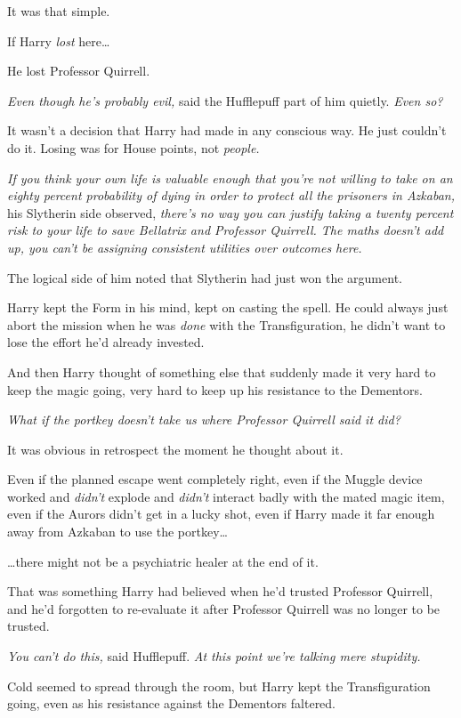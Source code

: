 It was that simple.

If Harry \emph{lost} here…

He lost Professor Quirrell.

\emph{Even though he’s probably evil,} said the Hufflepuff part of him quietly. \emph{Even so?}

It wasn’t a decision that Harry had made in any conscious way. He just couldn’t do it. Losing was for House points, not \emph{people.}

\emph{If you think your own life is valuable enough that you’re not willing to take on an eighty percent probability of dying in order to protect all the prisoners in Azkaban,} his Slytherin side observed, \emph{there’s no way you can justify taking a twenty percent risk to your life to save Bellatrix and Professor Quirrell. The maths doesn’t add up, you can’t be assigning consistent utilities over outcomes here.}

The logical side of him noted that Slytherin had just won the argument.

Harry kept the Form in his mind, kept on casting the spell. He could always just abort the mission when he was \emph{done} with the Transfiguration, he didn’t want to lose the effort he’d already invested.

And then Harry thought of something else that suddenly made it very hard to keep the magic going, very hard to keep up his resistance to the Dementors.

\emph{What if the portkey doesn’t take us where Professor Quirrell said it did?}

It was obvious in retrospect the moment he thought about it.

Even if the planned escape went completely right, even if the Muggle device worked and \emph{didn’t} explode and \emph{didn’t} interact badly with the mated magic item, even if the Aurors didn’t get in a lucky shot, even if Harry made it far enough away from Azkaban to use the portkey…

…there might not be a psychiatric healer at the end of it.

That was something Harry had believed when he’d trusted Professor Quirrell, and he’d forgotten to re-evaluate it after Professor Quirrell was no longer to be trusted.

\emph{You can’t do this,} said Hufflepuff. \emph{At this point we’re talking mere stupidity.}

Cold seemed to spread through the room, but Harry kept the Transfiguration going, even as his resistance against the Dementors faltered.

